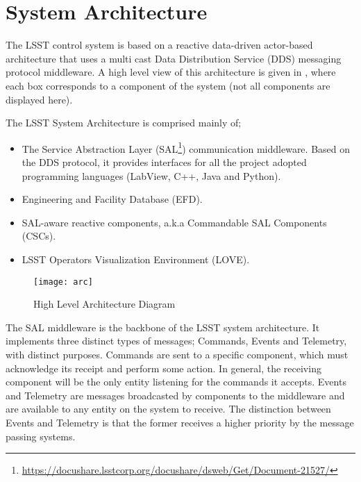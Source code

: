 \section{System Architecture} \label{sec:sysarc}


The LSST control system is based on a reactive data-driven actor-based architecture that uses a multi cast Data Distribution Service (DDS) messaging protocol middleware. A high level view of this architecture is given in , where each box corresponds to a component of the system (not all components are displayed here). 

The LSST System Architecture is comprised mainly of;
%
\begin{itemize}
\item The Service Abstraction Layer (SAL\footnote{\url{https://docushare.lsstcorp.org/docushare/dsweb/Get/Document-21527/}}) communication middleware. Based on the DDS protocol, it provides interfaces for all the project adopted programming languages (LabView, C++, Java and Python).
\item Engineering and Facility Database (EFD).
\item SAL-aware reactive components, a.k.a Commandable SAL Components (CSCs). 
\item LSST Operators Visualization Environment (LOVE).
\end{itemize}

\begin{figure}
\begin{center}
\texttt{[image: arc]}
\caption{High Level Architecture Diagram\label{fig:arc}}
\end{center}
\end{figure}

The SAL middleware is the backbone of the LSST system architecture. It implements three distinct types of messages; Commands, Events and Telemetry, with distinct purposes. Commands are sent to a specific component, which must acknowledge its receipt and perform some action. In general, the receiving component will be the only entity listening for the commands it accepts. Events and Telemetry are messages broadcasted by components to the middleware and are available to any entity on the system to receive. The distinction between Events and Telemetry is that the former receives a higher priority by the message passing systems. 

